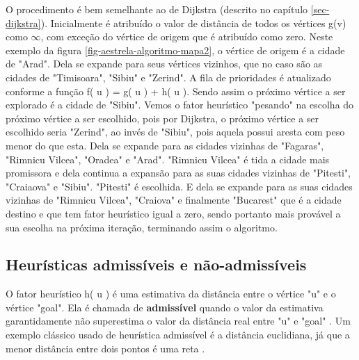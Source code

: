 O procedimento é bem semelhante ao de Dijkstra (descrito no capítulo \ref{sec-dijkstra}). Inicialmente é atribuído o valor de distância de todos os vértices g(v) como $\infty$, com exceção do vértice de origem que é atribuído como zero. Neste exemplo da figura \ref{fig-aestrela-algoritmo-mapa2}, o vértice de origem é a cidade de "Arad". Dela se expande para seus vértices vizinhos, que no caso são as cidades de "Timisoara", "Sibiu" e "Zerind". A fila de prioridades é atualizado conforme a função f( u ) = g( u ) + h( u ). Sendo assim o próximo vértice a ser explorado é a cidade de "Sibiu". Vemos o fator heurístico "pesando" na escolha do próximo vértice a ser escolhido, pois por Dijkstra, o próximo vértice a ser escolhido seria "Zerind", ao invés de "Sibiu", pois aquela possui aresta com peso menor do que esta. Dela se expande para as cidades vizinhas de "Fagaras", "Rimnicu Vilcea", "Oradea" e "Arad". "Rimnicu Vilcea" é tida a cidade mais promissora e dela continua a expansão para as suas cidades vizinhas de "Pitesti", "Craiaova" e "Sibiu". "Pitesti" é escolhida. E dela se expande para as suas cidades vizinhas de "Rimnicu Vilcea", "Craiova" e finalmente "Bucarest" que é a cidade destino e que tem fator heurístico igual a zero, sendo portanto mais provável a sua escolha na próxima iteração, terminando assim o algoritmo.






\subsection{Heurísticas admissíveis e não-admissíveis}
\label{sec-aestrela-algoritmo-heuristica}  
O fator heurístico h( u ) é uma estimativa da distância entre o vértice "u" e o vértice "goal". Ela é chamada de \textbf{admissível} quando o valor da estimativa garantidamente não superestima o valor da distância real entre "u" e "goal" \cite{russell1995modern}. Um exemplo clássico usado de heurística admissível é a distância euclidiana, já que a menor distância entre dois pontos é uma reta \cite{russell1995modern}.

